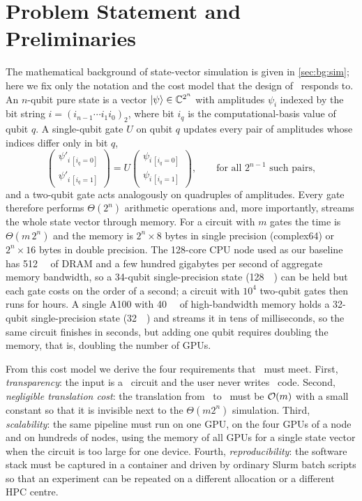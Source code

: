 \section{Problem Statement and Preliminaries}\label{sec:qgear:problem}

The mathematical background of state-vector simulation is given in \cref{sec:bg:sim}; here we fix only the notation and the cost model that the design of \qgear\ responds to. An $n$-qubit pure state is a vector $\ket{\psi}\in\mathbb{C}^{2^{n}}$ with amplitudes $\psi_{i}$ indexed by the bit string $i=(i_{n-1}\cdots i_{1}i_{0})_{2}$, where bit $i_{q}$ is the computational-basis value of qubit $q$. A single-qubit gate $U$ on qubit $q$ updates every pair of amplitudes whose indices differ only in bit $q$,
\begin{equation}\label{eq:qgear:sqgate}
  \begin{pmatrix}\psi'_{i\,[i_{q}=0]}\\ \psi'_{i\,[i_{q}=1]}\end{pmatrix}
  = U \begin{pmatrix}\psi_{i\,[i_{q}=0]}\\ \psi_{i\,[i_{q}=1]}\end{pmatrix},
  \qquad \text{for all } 2^{n-1} \text{ such pairs},
\end{equation}
and a two-qubit gate acts analogously on quadruples of amplitudes. Every gate therefore performs $\Theta(2^{n})$ arithmetic operations and, more importantly, streams the whole state vector through memory. For a circuit with $m$ gates the time is $\Theta(m\,2^{n})$ and the memory is $2^{n}\times 8$ bytes in single precision (complex64) or $2^{n}\times 16$ bytes in double precision. The 128-core CPU node used as our baseline has \SI{512}{\giga\byte} of DRAM and a few hundred gigabytes per second of aggregate memory bandwidth, so a 34-qubit single-precision state (\SI{128}{\giga\byte}) can be held but each gate costs on the order of a second; a circuit with $10^{4}$ two-qubit gates then runs for hours. A single A100 with \SI{40}{\giga\byte} of high-bandwidth memory holds a 32-qubit single-precision state (\SI{32}{\giga\byte}) and streams it in tens of milliseconds, so the same circuit finishes in seconds, but adding one qubit requires doubling the memory, that is, doubling the number of GPUs.

From this cost model we derive the four requirements that \qgear\ must meet. First, \emph{transparency}: the input is a \qiskit\ circuit and the user never writes \cudaq\ code. Second, \emph{negligible translation cost}: the translation from \qiskit\ to \cudaq\ must be $\mathcal{O}\!\left(m\right)$ with a small constant so that it is invisible next to the $\Theta(m 2^{n})$ simulation. Third, \emph{scalability}: the same pipeline must run on one GPU, on the four GPUs of a node and on hundreds of nodes, using the memory of all GPUs for a single state vector when the circuit is too large for one device. Fourth, \emph{reproducibility}: the software stack must be captured in a container and driven by ordinary Slurm batch scripts so that an experiment can be repeated on a different allocation or a different HPC centre.

